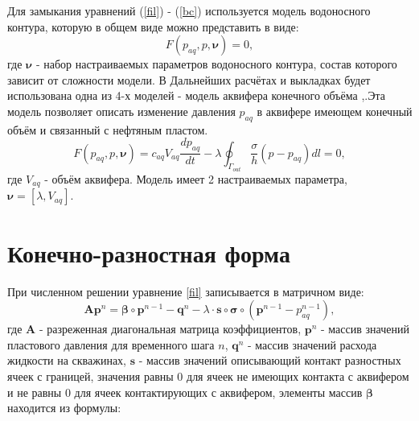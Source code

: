 \documentclass[14pt]{article}
\begin{document}
Для замыкания уравнений (\ref{fil}) - (\ref{bc}) используется модель водоносного контура, которую в общем виде можно представить в виде: 
\begin{equation} \label{f_aq}
F(p_{aq}, p,\boldsymbol{\nu})=0,
\end{equation}
где $\boldsymbol{\nu}$ - набор настраиваемых параметров водоносного контура, состав которого зависит от сложности модели. В Дальнейших расчётах и выкладках будет использована одна из 4-х моделей - модель аквифера конечного объёма \cite{dake},\cite{fet}.Эта модель позволяет описать изменение давления $p_{aq}$ в аквифере имеющем конечный объём и связанный с нефтяным пластом. 
\begin{equation} \label{aq_analit}
F(p_{aq}, p,\boldsymbol{\nu})=c_{aq}V_{aq}\frac{dp_{aq}}{dt} - \lambda\oint_{\Gamma_{out}}\frac{\sigma}{h}(p-p_{aq})dl = 0,
\end{equation}
где $V_{aq}$ - объём аквифера. Модель имеет 2 настраиваемых параметра, $\boldsymbol{\nu} = [\lambda, V_{aq}]$.

\section{Конечно-разностная форма} 
При численном решении уравнение \ref{fil} записывается в матричном виде:
\begin{equation} \label{fil_fin_def}
\boldsymbol{A}\boldsymbol{p}^n = \boldsymbol{\beta}\circ\boldsymbol{p}^{n-1} - \boldsymbol{q}^n - \lambda \cdot \boldsymbol{s}\circ\boldsymbol{\sigma}\circ (\boldsymbol{p}^{n-1}-p_{aq}^{n-1}),
\end{equation}
где $\boldsymbol{A}$ - разреженная диагональная матрица коэффициентов, $ \boldsymbol{p}^n $ - массив значений пластового давления для временного шага $ n $,  $ \boldsymbol{q}^n $ - массив значений расхода жидкости на скважинах, $ \boldsymbol{s} $ - массив значений описывающий контакт разностных ячеек с границей, значения равны 0 для ячеек не имеющих контакта с аквифером и не равны 0 для ячеек контактирующих с аквифером, элементы массив $ \boldsymbol{\beta} $ находится из формулы:
\end{document}
